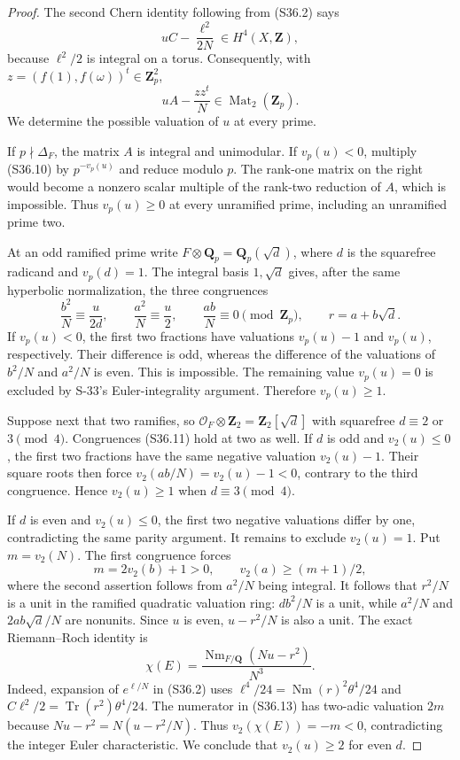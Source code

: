 \documentclass[11pt,a4paper]{article}
\theoremstyle{definition}
\begin{document}
\begin{proof}
The second Chern identity following from (S36.2) says
\[
 uC-\frac{\ell^2}{2N}\in H^4(X,\mathbf Z),
 \tag{S36.9}
\]
because $\ell^2/2$ is integral on a torus. Consequently,
with $z=(f(1),f(\omega))^t\in\mathbf Z_p^2$,
\[
 uA-\frac{zz^t}{N}\in\operatorname{Mat}_2(\mathbf Z_p).
 \tag{S36.10}
\]
We determine the possible valuation of $u$ at every prime.

If $p\nmid\Delta_F$, the matrix $A$ is integral and
unimodular. If $v_p(u)<0$, multiply (S36.10) by
$p^{-v_p(u)}$ and reduce modulo $p$. The rank-one
matrix on the right would become a nonzero scalar
multiple of the rank-two reduction of $A$, which is
impossible. Thus $v_p(u)\ge0$ at every unramified prime,
including an unramified prime two.

At an odd ramified prime write $F\otimes\mathbf Q_p
=\mathbf Q_p(\sqrt d)$, where $d$ is the squarefree
radicand and $v_p(d)=1$. The integral basis
$1,\sqrt d$ gives, after the same hyperbolic
normalization, the three congruences
\[
 \frac{b^2}{N}\equiv\frac{u}{2d},\qquad
 \frac{a^2}{N}\equiv\frac u2,\qquad
 \frac{ab}{N}\equiv0\pmod{\mathbf Z_p},
 \qquad r=a+b\sqrt d.
 \tag{S36.11}
\]
If $v_p(u)<0$, the first two fractions have valuations
$v_p(u)-1$ and $v_p(u)$, respectively. Their difference
is odd, whereas the difference of the valuations of
$b^2/N$ and $a^2/N$ is even. This is impossible.
The remaining value $v_p(u)=0$ is excluded by S-33's
Euler-integrality argument. Therefore $v_p(u)\ge1$.

Suppose next that two ramifies, so
$\mathcal O_F\otimes\mathbf Z_2=\mathbf Z_2[\sqrt d]$
with squarefree $d\equiv2$ or $3\pmod4$.
Congruences (S36.11) hold at two as well.
If $d$ is odd and $v_2(u)\le0$, the first two fractions
have the same negative valuation $v_2(u)-1$.
Their square roots then force
$v_2(ab/N)=v_2(u)-1<0$, contrary to the third congruence.
Hence $v_2(u)\ge1$ when $d\equiv3\pmod4$.

If $d$ is even and $v_2(u)\le0$, the first two
negative valuations differ by one, contradicting the
same parity argument. It remains to exclude
$v_2(u)=1$. Put $m=v_2(N)$. The first congruence
forces
\[
 m=2v_2(b)+1>0,
 \qquad v_2(a)\ge(m+1)/2,
 \tag{S36.12}
\]
where the second assertion follows from $a^2/N$ being
integral. It follows that $r^2/N$ is a unit in the
ramified quadratic valuation ring: $db^2/N$ is a unit,
while $a^2/N$ and $2ab\sqrt d/N$ are nonunits.
Since $u$ is even, $u-r^2/N$ is also a unit.
The exact Riemann--Roch identity is
\[
 \chi(E)=\frac{\operatorname{Nm}_{F/\mathbf Q}(Nu-r^2)}{N^3}.
 \tag{S36.13}
\]
Indeed, expansion of $e^{\ell/N}$ in (S36.2) uses
$\ell^4/24=\operatorname{Nm}(r)^2\theta^4/24$ and
$C\ell^2/2=\operatorname{Tr}(r^2)\theta^4/24$.
The numerator in (S36.13) has two-adic valuation $2m$
because $Nu-r^2=N(u-r^2/N)$. Thus $v_2(\chi(E))=-m<0$,
contradicting the integer Euler characteristic.
We conclude that $v_2(u)\ge2$ for even $d$.


\end{proof}
\end{document}
